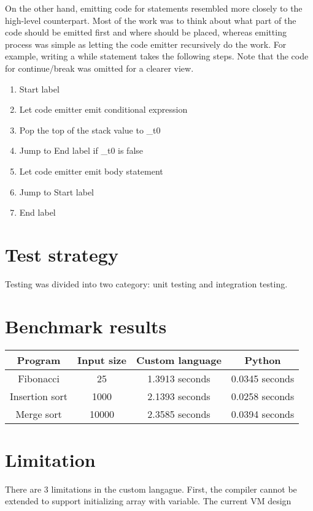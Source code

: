 \documentclass[manuscript,screen,nonacm]{acmart}
\begin{document}
On the other hand, emitting code for statements resembled more closely to the high-level counterpart. Most of the work was to think about what part of the code should be emitted first and where should be placed, whereas emitting process was simple as letting the code emitter recursively do the work. For example, writing a while statement takes the following steps. Note that the code for continue/break was omitted for a clearer view.
\begin{enumerate}
    \item Start label
    \item Let code emitter emit conditional expression
    \item Pop the top of the stack value to \_t0
    \item Jump to End label if \_t0 is false 
    \item Let code emitter emit body statement
    \item Jump to Start label
    \item End label 
\end{enumerate} 


\section{Test strategy}
Testing was divided into two category: unit testing and integration testing.

\section{Benchmark results}

\begin{center}
\begin{tabular}{|c|c|c|c|}
    \hline
    Program & Input size & Custom language & Python \\
    \hline
    Fibonacci & 25 & 1.3913 seconds & 0.0345 seconds \\
    Insertion sort & 1000 & 2.1393 seconds & 0.0258 seconds \\
    Merge sort & 10000 & 2.3585 seconds & 0.0394 seconds \\
    \hline
\end{tabular}
\end{center}

\section{Limitation}
There are 3 limitations in the custom langague. First, the compiler cannot be extended to support initializing array with variable. The current VM design 
\end{document}
